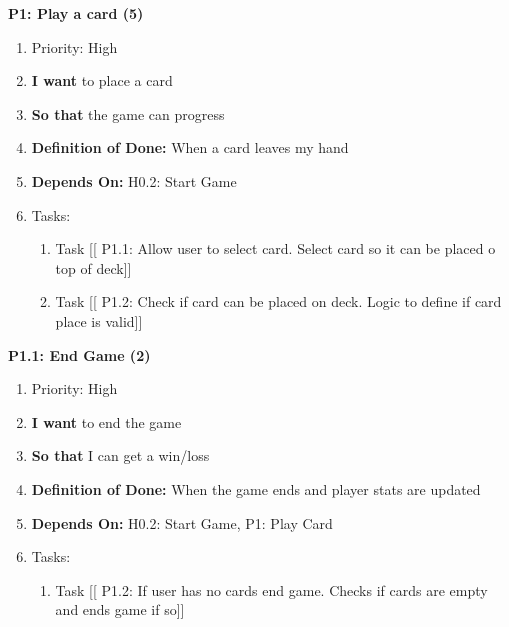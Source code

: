 \textbf{P1: Play a card (5)}
\begin{enumerate}
    \item Priority: High
    \item \textbf{I want} to place a card
    \item \textbf{So that} the game can progress
    \item \textbf{Definition of Done:} When a card leaves my hand
    \item \textbf{Depends On:} H0.2: Start Game
    \item Tasks:
    \begin{enumerate}
        \item Task [[ P1.1: Allow user to select card. Select card so it can be placed o top of deck]]
        \item Task [[ P1.2: Check if card can be placed on deck. Logic to define if card place is valid]]
    \end{enumerate}
\end{enumerate}

\vspace{2em}

\textbf{P1.1: End Game (2)}
\begin{enumerate}
    \item Priority: High
    \item \textbf{I want} to end the game
    \item \textbf{So that} I can get a win/loss
    \item \textbf{Definition of Done:} When the game ends and player stats are updated
    \item \textbf{Depends On:} H0.2: Start Game, P1: Play Card
    \item Tasks:
    \begin{enumerate}
        \item Task [[ P1.2: If user has no cards end game. Checks if cards are empty and ends game if so]]
    \end{enumerate}
\end{enumerate}

\vspace{2em}

